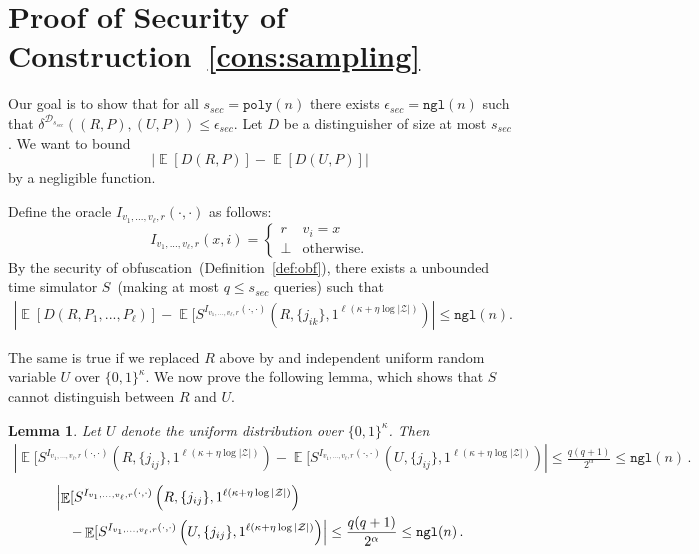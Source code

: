 \documentclass[11pt]{article}
\newtheorem{lemma}[theorem]{Lemma}
\newcommand{\defref}[1]{\mbox{Definition~\ref{#1}}}
\newcommand{\consref}[1]{\mbox{Construction~\ref{#1}}}
\DeclareMathOperator*{\expe}{\mathbb{E}}
\newcommand{\zo}{\ensuremath{\{0, 1\}}}
\newcommand{\poly}{\ensuremath{\mathtt{poly}}\xspace}
\newcommand{\ngl}{\ensuremath{\mathtt{ngl}}\xspace}
\newcommand{\subsetEntropy}{\alpha}
\begin{document}
\section{Proof of Security of \consref{cons:sampling}}
\label{sec:analysis sampling}
 Our goal is to show that for all $s_{sec} = \poly(n)$ there exists $\epsilon_{sec} =\ngl(n)$ such that $\delta^{\mathcal{D}_{s_{sec}}}((R, P), (U, P))\le \epsilon_{sec}$. Let $D$ be a distinguisher of size at most $s_{sec}$. We want to bound 
\[
| \expe[D(R, P)] - \expe[D(U, P)]|
\]
by a negligible function.

Define the oracle $I_{v_1, ..., v_\ell, r}(\cdot, \cdot)$ as follows:
\[I_{v_1,..., v_\ell, r}(x, i) =
\begin{cases}
r & v_i = x\\
\perp & \text{otherwise.}
\end{cases}\]
By the security of obfuscation~(\defref{def:obf}), there exists a unbounded time simulator $S$~(making at most $q\le s_{sec}$ queries) such that
\begin{align}
\label{eq:dist before sampling}
\left|\expe [D(R, P_1,..., P_\ell)] - \expe [S^{I_{v_1, ..., v_\ell, r}(\cdot, \cdot)} \left (R, \{j_{ik}\}, 1^{\ell (\kappa+\eta\log |\mathcal Z|)} \right) \right|  \leq\ngl(n).
\end{align}

The same is true if we replaced $R$ above by and independent uniform random variable $U$ over $\zo^\kappa$. 
We now prove the following lemma, which shows that $S$ cannot distinguish between $R$ and $U$.

\begin{lemma}
\label{lem:sim cannot distinguish samp}
Let $U$ denote the uniform distribution over $\zo^\kappa$. Then
\ifnum{}
\begin{align}
\left| \expe [S^{I_{v_1, ..., v_\ell, r}(\cdot, \cdot)} \left (R, \{j_{ij}\}, 1^{\ell (\kappa+\eta\log |\mathcal Z|)} \right) 
- \expe [S^{I_{v_1, ..., v_\ell, r}(\cdot, \cdot)}  
\left (U, \{j_{ij}\}, 1^{\ell (\kappa+\eta\log |\mathcal Z|)} \right)\right|
\le \frac{q(q+1)}{2^\subsetEntropy} \le \ngl(n)\,.
\label{eq:sim cannot distinguish samp}
\end{align}
\else
\begin{eqnarray}
\lefteqn{
\left| \expe [S^{I_{v_1, ..., v_\ell, r}(\cdot, \cdot)} \left (R, \{j_{ij}\}, 1^{\ell (\kappa+\eta\log |\mathcal Z|)} \right) 
\right.} \nonumber \\
& & \left.
- \expe [S^{I_{v_1, ..., v_\ell, r}(\cdot, \cdot)}  
\left (U, \{j_{ij}\}, 1^{\ell (\kappa+\eta\log |\mathcal Z|)} \right)\right|
\le \frac{q(q+1)}{2^\subsetEntropy} \le \ngl(n)\,.
\label{eq:sim cannot distinguish samp}
\end{eqnarray}
\fi


\end{lemma}
\end{document}

